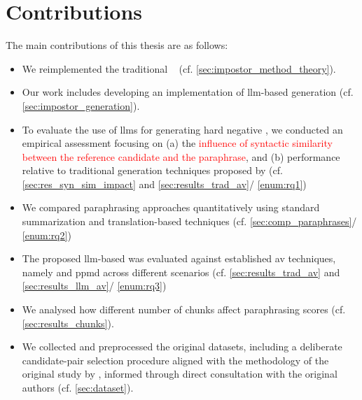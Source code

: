 


\section{Contributions}
\label{sec:contributions}
The main contributions of this thesis are as follows:
\begin{itemize}
    \item We reimplemented the traditional \impAppr{}~\citep{koppel_determining_2014} (cf. \autoref{sec:impostor_method_theory}).
    \item Our work includes developing an implementation of \ac{llm}-based \imp{} generation (cf. \autoref{sec:impostor_generation}). 
    \item To evaluate the use of \acp{llm} for generating hard negative \imps{}, we conducted an empirical assessment focusing on (a) the \textcolor{red}{influence of syntactic similarity between the reference candidate and the paraphrase}, and (b) performance relative to traditional \imp{} generation techniques proposed by \citet{koppel_determining_2014} (cf. \autoref{sec:res_syn_sim_impact} and \autoref{sec:results_trad_av}/ \ref{enum:rq1})
    \item We compared paraphrasing approaches quantitatively using standard summarization and translation-based techniques (cf. \autoref{sec:comp_paraphrases}/ \ref{enum:rq2})
    \item The proposed \ac{llm}-based \impAppr{} was evaluated against established \ac{av} techniques, namely \unmasking{} and \ac{ppmd} across different scenarios (cf. \autoref{sec:results_trad_av} and \autoref{sec:results_llm_av}/ \ref{enum:rq3})
    \item We analysed how different number of chunks affect paraphrasing scores (cf. \autoref{sec:results_chunks}).
    \item We collected and preprocessed the original datasets, including a deliberate candidate-pair selection procedure aligned with the methodology of the original study by \citet{koppel_determining_2014}, informed through direct consultation with the original authors (cf. \autoref{sec:dataset}).
\end{itemize}



